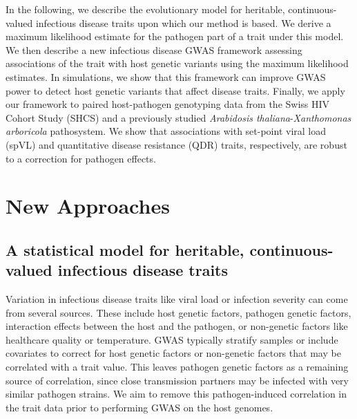 \documentclass[11pt]{article}
\begin{document}
\begin{linenumbers}

In the following, we describe the evolutionary model for heritable, continuous-valued infectious disease traits upon which our method is based. We derive a maximum likelihood estimate for the pathogen part of a trait under this model. We then describe a new infectious disease GWAS framework assessing associations of the trait with host genetic variants using the maximum likelihood estimates. In simulations, we show that this framework can improve GWAS power to detect host genetic variants that affect disease traits. Finally, we apply our framework to paired host-pathogen genotyping data from the Swiss HIV Cohort Study (SHCS) and a previously studied \emph{Arabidosis thaliana}-\emph{Xanthomonas arboricola} pathosystem. We show that associations with set-point viral load (spVL) and quantitative disease resistance (QDR) traits, respectively, are robust to a correction for pathogen effects.

\section*{New Approaches}
\subsection*{A statistical model for heritable, continuous-valued infectious disease traits}

Variation in infectious disease traits like viral load or infection severity can come from several sources. These include host genetic factors, pathogen genetic factors, interaction effects between the host and the pathogen, or non-genetic factors like healthcare quality or temperature. GWAS typically stratify samples or include covariates to correct for host genetic factors or non-genetic factors that may be correlated with a trait value. This leaves pathogen genetic factors as a remaining source of correlation, since close transmission partners may be infected with very similar pathogen strains. We aim to remove this pathogen-induced correlation in the trait data prior to performing GWAS on the host genomes.



\end{linenumbers}
\end{document}
